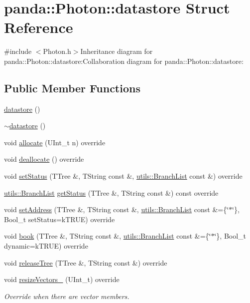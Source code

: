 \hypertarget{structpanda_1_1Photon_1_1datastore}{
\section{panda::Photon::datastore Struct Reference}
\label{structpanda_1_1Photon_1_1datastore}
}


{\ttfamily \#include $<$Photon.h$>$}Inheritance diagram for panda::Photon::datastore:Collaboration diagram for panda::Photon::datastore:\subsection*{Public Member Functions}
\begin{DoxyCompactItemize}
\item 
\hyperlink{structpanda_1_1Photon_1_1datastore_aaaad2d7371a41dbeff49ca7689cf5b08}{datastore} ()
\item 
\hyperlink{structpanda_1_1Photon_1_1datastore_a7282a7c7cc04a9350041a59e9ecba5b5}{$\sim$datastore} ()
\item 
void \hyperlink{structpanda_1_1Photon_1_1datastore_aafdc384cc9e57f60b6acecb3ad82fdb2}{allocate} (UInt\_\-t n) override
\item 
void \hyperlink{structpanda_1_1Photon_1_1datastore_a255374780b23e06a1fd24235847c77de}{deallocate} () override
\item 
void \hyperlink{structpanda_1_1Photon_1_1datastore_a809ca2b31f632a8503ee2dc839be55ed}{setStatus} (TTree \&, TString const \&, \hyperlink{classpanda_1_1utils_1_1BranchList}{utils::BranchList} const \&) override
\item 
\hyperlink{classpanda_1_1utils_1_1BranchList}{utils::BranchList} \hyperlink{structpanda_1_1Photon_1_1datastore_a3a0f1b3be1d8cfa4bb5d6a5a6a48997d}{getStatus} (TTree \&, TString const \&) const override
\item 
void \hyperlink{structpanda_1_1Photon_1_1datastore_a42cc43286a630dcffc73652309aa8990}{setAddress} (TTree \&, TString const \&, \hyperlink{classpanda_1_1utils_1_1BranchList}{utils::BranchList} const \&=\{\char`\"{}$\ast$\char`\"{}\}, Bool\_\-t setStatus=kTRUE) override
\item 
void \hyperlink{structpanda_1_1Photon_1_1datastore_aecd0493c1cce6f3cbcb0e0d797f83719}{book} (TTree \&, TString const \&, \hyperlink{classpanda_1_1utils_1_1BranchList}{utils::BranchList} const \&=\{\char`\"{}$\ast$\char`\"{}\}, Bool\_\-t dynamic=kTRUE) override
\item 
void \hyperlink{structpanda_1_1Photon_1_1datastore_a05f8dcdf1df8a1e105ca3167c2ab94e2}{releaseTree} (TTree \&, TString const \&) override
\item 
void \hyperlink{structpanda_1_1Photon_1_1datastore_a819de9f7590bca725315d2b6432b0f6a}{resizeVectors\_\-} (UInt\_\-t) override
\begin{DoxyCompactList}\small\item\em Override when there are vector members. \item\end{DoxyCompactList}\end{DoxyCompactItemize}


